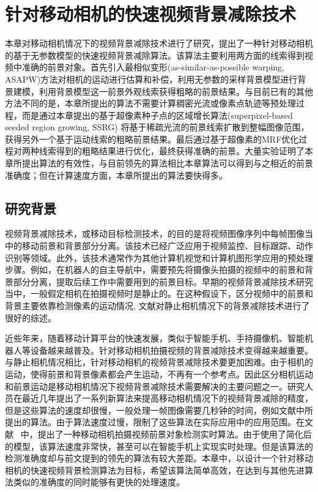 \chapter{针对移动相机的快速视频背景减除技术}
 \label{ch4:FMCBS}
 本章对移动相机情况下的视频背景减除技术进行了研究，提出了一种针对移动相机的基于无参数模型的快速视频背景减除算法。该算法主要利用两方面的线索得到视频中准确的前景对象。首先引入最相似变形(as-similar-as-possible warping, ASAPW)方法对相机的运动进行估算和补偿，利用无参数的采样背景模型进行背景建模，利用背景模型这一前景外观线索获得粗略的前景结果。与目前已有的其他方法不同的是，本章所提出的算法不需要计算稠密光流或像素点轨迹等预处理过程，而是通过本章提出的基于超像素种子点的区域增长算法(superpixel-based seeded region growing, SSRG) 将基于稀疏光流的前景线索扩散到整幅图像范围，获得另外一个基于运动线索的粗略前景结果。最后通过基于超像素的MRF优化过程对两种线索得到的粗略结果进行优化，最终获得准确的前景。大量实验证明了本章所提出算法的有效性，与目前领先的算法相比本章算法可以得到与之相近的前景准确度；但在计算速度方面，本章所提出的算法要快得多。

 \section{研究背景}
 \label{ch4:sec:background}
视频背景减除技术，或移动目标检测技术，的目的是将视频图像序列中每帧图像当中的移动前景和背景部分分离。该技术已经广泛应用于视频监控、目标跟踪、动作识别等领域。此外，该技术通常作为其他计算机视觉和计算机图形学应用的预处理步骤。例如，在机器人的自主导航中，需要预先将摄像头拍摄的视频中的前景和背景部分分离，提取后续工作中需要用到的前景目标。早期的视频背景减除技术研究当中，一般假定相机在拍摄视频时是静止的。在这种假设下，区分视频中的前景和背景主要依靠检测像素的运动情况\cite{GMMPAMI,Barnich2011ViBe,pbas,vibe,subsenseTIP}, 文献对静止相机情况下的背景减除技术进行了很好的综述。\par

近些年来，随着移动计算平台的快速发展，类似于智能手机、手持摄像机、智能机器人等设备越来越普及。针对移动相机拍摄视频的背景减除技术变得越来越重要。与静止相机情况相比，针对移动相机的视频背景减除技术要更加困难。由于相机的运动，使得前景和背景像素都会产生运动，不再有一个参考点。因此区分相机运动和前景运动是移动相机情况下视频背景减除技术需要解决的主要问题之一。研究人员在最近几年提出了一系列新算法来提高移动相机情况下的视频背景减除的精度\cite{iccv2009,kwak2011Generalized,Cui2012,Multitransform,gbsuperpixel,SubspaceTracking}，但是这些算法的速度却很慢，一般处理一帧图像需要几秒钟的时间，例如文献中所提出的算法。由于算法速度过慢，限制了这些算法在实际应用中的应用范围。在文献 ~中，提出了一种移动相机拍摄视频前景对象检测实时算法。由于使用了简化后的模型，该算法速度非常快，甚至可以在智能手机上实现实时处理。但是该算法的检测准确度却与前文提到的领先的算法有较大差距。本章中，以设计一个针对移动相机的快速视频背景检测算法为目标，希望该算法简单高效，在达到与其他先进算法类似的准确度的同时能够有更快的处理速度。\par

